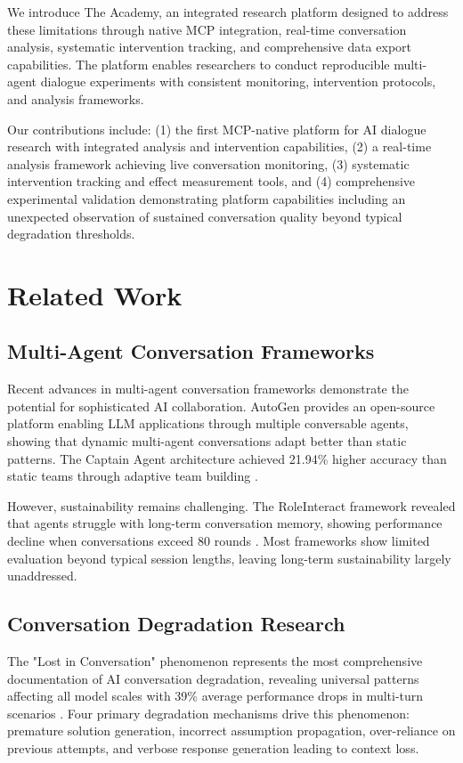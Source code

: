 \documentclass[11pt,letterpaper]{article}
\newcommand{\theacademy}{The Academy}
\newcommand{\mcp}{MCP}
\begin{document}
We introduce \theacademy{}, an integrated research platform designed to address these limitations through native \mcp{} integration, real-time conversation analysis, systematic intervention tracking, and comprehensive data export capabilities. The platform enables researchers to conduct reproducible multi-agent dialogue experiments with consistent monitoring, intervention protocols, and analysis frameworks.

Our contributions include: (1) the first \mcp{}-native platform for AI dialogue research with integrated analysis and intervention capabilities, (2) a real-time analysis framework achieving live conversation monitoring, (3) systematic intervention tracking and effect measurement tools, and (4) comprehensive experimental validation demonstrating platform capabilities including an unexpected observation of sustained conversation quality beyond typical degradation thresholds.

\section{Related Work}

\subsection{Multi-Agent Conversation Frameworks}

Recent advances in multi-agent conversation frameworks demonstrate the potential for sophisticated AI collaboration. AutoGen \citep{wu2023autogen} provides an open-source platform enabling LLM applications through multiple conversable agents, showing that dynamic multi-agent conversations adapt better than static patterns. The Captain Agent architecture achieved 21.94\% higher accuracy than static teams through adaptive team building \citep{song2025adaptive}.

However, sustainability remains challenging. The RoleInteract framework revealed that agents struggle with long-term conversation memory, showing performance decline when conversations exceed 80 rounds \citep{chen2023chatarena}. Most frameworks show limited evaluation beyond typical session lengths, leaving long-term sustainability largely unaddressed.

\subsection{Conversation Degradation Research}

The "Lost in Conversation" phenomenon represents the most comprehensive documentation of AI conversation degradation, revealing universal patterns affecting all model scales with 39\% average performance drops in multi-turn scenarios \citep{laban2025lost}. Four primary degradation mechanisms drive this phenomenon: premature solution generation, incorrect assumption propagation, over-reliance on previous attempts, and verbose response generation leading to context loss.
\end{document}
